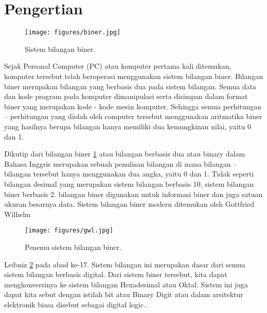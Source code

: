 


%

\section{Pengertian}

\begin{figure}[ht]
\centerline{\texttt{[image: figures/biner.jpg]}}
\caption{Sistem bilangan biner.}
\label{biner}
\end{figure}

Sejak Personal Computer (PC) atau komputer pertama kali ditemukan, komputer tersebut telah beroperasi menggunakan sistem bilangan biner. Bilangan biner merupakan bilangan yang berbasis dua pada sistem bilangan. Semua data dan kode program pada komputer dimanipulasi serta disimpan dalam format biner yang merupakan kode - kode mesin komputer. Sehingga semua perhitungan – perhitungan yang diolah oleh computer tersebut menggunakan aritmatika biner yang hasilnya berupa bilangan hanya memiliki dua kemungkinan nilai, yaitu 0 dan 1.

Dikutip dari \cite{hutahaean2015konsep} bilangan biner \ref{biner} atau bilangan berbasis dua atau binary dalam Bahasa Inggris merupakan sebuah penulisan bilangan di mana bilangan – bilangan tersebut hanya menggunakan dua angka, yaitu 0 dan 1. Tidak seperti bilangan desimal yang merupakan sistem bilangan berbasis 10, sistem bilangan biner berbasis 2. bilangan biner digunakan untuk informasi biner dan juga satuan ukuran besarnya data. Sistem bilangan biner modern ditemukan oleh Gottfried Wilhelm

\begin{figure}[ht]
\centerline{\texttt{[image: figures/gwl.jpg]}}
\caption{Penemu sistem bilangan biner.}
\label{gwl}
\end{figure}

Leibniz \ref{gwl} pada abad ke-17. Sistem bilangan ini merupakan dasar dari semua sistem bilangan berbasis digital. Dari sistem biner tersebut, kita dapat mengkonversinya ke sistem bilangan Hexadesimal atau Oktal. Sistem ini juga dapat kita sebut dengan istilah bit atau Binary Digit atau dalam arsitektur elektronik biasa disebut sebagai digital logic..

